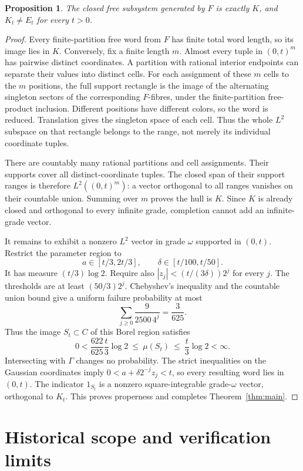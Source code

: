 \documentclass[11pt]{article}
\newtheorem{proposition}[theorem]{Proposition}
\theoremstyle{remark}\newtheorem{remark}[theorem]{Remark}
\begin{document}
\begin{proposition}\label{prop:hull}
The closed free subsystem generated by $F$ is exactly $K$, and
$K_t\ne E_t$ for every $t>0$.
\end{proposition}

\begin{proof}
Every finite-partition free word from $F$ has finite total word length, so its
image lies in $K$. Conversely, fix a finite length $m$. Almost every tuple in
$(0,t)^m$ has pairwise distinct coordinates. A partition with rational
interior endpoints can separate their values into distinct cells. For each
assignment of these $m$ cells to the $m$ positions, the full support rectangle
is the image of the alternating singleton sectors of the corresponding
$F$-fibres, under the finite-partition free-product inclusion. Different
positions have different colors, so the word is reduced. Translation gives
the singleton space of each cell. Thus the whole $L^2$ subspace on that
rectangle belongs to the range, not merely its individual coordinate tuples.

There are countably many rational partitions and cell assignments. Their
supports cover all distinct-coordinate tuples. The closed span of their
support ranges is therefore $L^2((0,t)^m)$: a vector orthogonal to all ranges
vanishes on their countable union. Summing over $m$ proves the hull is $K$.
Since $K$ is already closed and orthogonal to every infinite grade, completion
cannot add an infinite-grade vector.

It remains to exhibit a nonzero $L^2$ vector in grade $\omega$ supported in
$(0,t)$. Restrict the parameter region to
\[
 a\in[t/3,2t/3],\qquad \delta\in[t/100,t/50].
\]
It has measure $(t/3)\log2$. Require also
$|z_j|<(t/(3\delta))2^j$ for every $j$. The thresholds are at least
$(50/3)2^j$. Chebyshev's inequality and the countable union bound give a
uniform failure probability at most
\[
 \sum_{j\geq0}\frac{9}{2500\,4^j}=\frac3{625}.
\]
Thus the image $S_t\subset C$ of this Borel region satisfies
\[
 0<\frac{622}{625}\frac t3\log2\ \leq\ \mu(S_t)
 \ \leq\ \frac t3\log2<\infty.
\]
Intersecting with $\Gamma$ changes no probability. The strict inequalities
on the Gaussian coordinates imply $0<a+\delta2^{-j}z_j<t$, so every resulting
word lies in $(0,t)$. The indicator $1_{S_t}$ is a nonzero square-integrable
grade-$\omega$ vector, orthogonal to $K_t$. This proves properness and
completes Theorem~\ref{thm:main}.
\end{proof}

\section{Historical scope and verification limits}\label{sec:scope}
\end{document}
